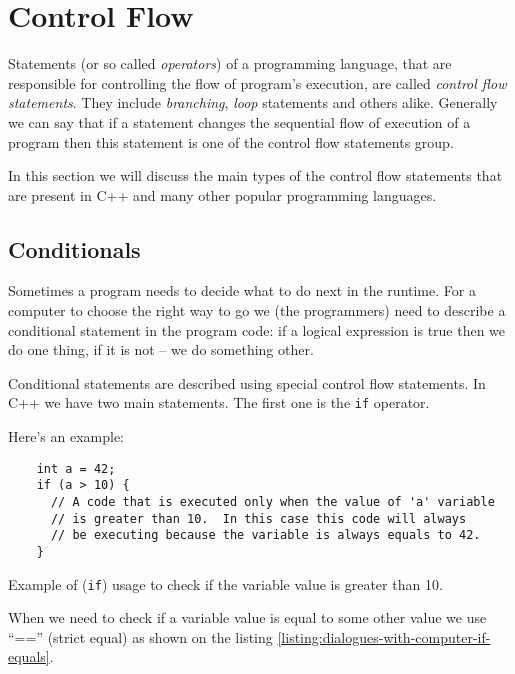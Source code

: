 \documentclass[../sparc.tex]{subfiles}
\begin{document}
\section{Control Flow}

Statements (or so called \emph{operators}) of a programming language, that are
responsible for controlling the flow of program's execution, are called
\emph{control flow statements}.  They include \emph{branching}, \emph{loop}
statements and others alike.  Generally we can say that if a statement changes
the sequential flow of execution of a program then this statement is one of the
control flow statements group.

In this section we will discuss the main types of the control flow statements
that are present in C++ and many other popular programming languages.

\subsection{Conditionals}

Sometimes a program needs to decide what to do next in the runtime.  For a
computer to choose the right way to go we (the programmers) need to describe a
conditional statement in the program code: if a logical expression is true then
we do one thing, if it is not -- we do something other.

Conditional statements are described using special control flow statements.  In
C++ we have two main statements.  The first one is the \texttt{if} operator.

Here's an example:

\begin{listing}[ht]
  \begin{verbatim}
    int a = 42;
    if (a > 10) {
      // A code that is executed only when the value of 'a' variable
      // is greater than 10.  In this case this code will always
      // be executing because the variable is always equals to 42.
    }
  \end{verbatim}
  \label{listing:dialogues-with-computer-if-more-than}
  \caption{Example of (\texttt{if}) usage to check if the variable value is
    greater than 10.}
\end{listing}

When we need to check if a variable value is equal to some other value we use
``=='' (strict equal) as shown on the listing
\ref{listing:dialogues-with-computer-if-equals}.
\end{document}
